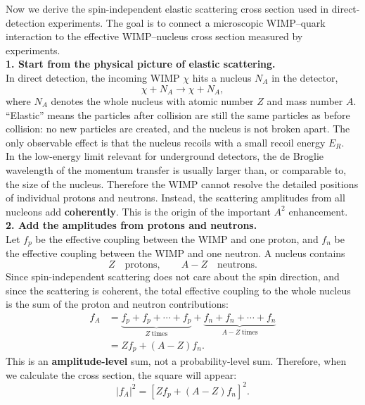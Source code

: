 \clearpage
\begin{foundation}
    Now we derive the spin-independent elastic scattering cross section used in direct-detection experiments. The goal is to connect a microscopic WIMP--quark interaction to the effective WIMP--nucleus cross section measured by experiments. \\

    \textbf{1. Start from the physical picture of elastic scattering.}\\
    In direct detection, the incoming WIMP $\chi$ hits a nucleus $N_A$ in the detector,
    \[
        \chi + N_A \rightarrow \chi + N_A,
    \]
    where $N_A$ denotes the whole nucleus with atomic number $Z$ and mass number $A$. ``Elastic'' means the particles after collision are still the same particles as before collision: no new particles are created, and the nucleus is not broken apart. The only observable effect is that the nucleus recoils with a small recoil energy $E_R$. \\

    In the low-energy limit relevant for underground detectors, the de Broglie wavelength of the momentum transfer is usually larger than, or comparable to, the size of the nucleus. Therefore the WIMP cannot resolve the detailed positions of individual protons and neutrons. Instead, the scattering amplitudes from all nucleons add \textbf{coherently}. This is the origin of the important $A^2$ enhancement. \\

    \textbf{2. Add the amplitudes from protons and neutrons.}\\
    Let $f_p$ be the effective coupling between the WIMP and one proton, and $f_n$ be the effective coupling between the WIMP and one neutron. A nucleus contains
    \[
        Z \quad \text{protons}, \qquad A-Z \quad \text{neutrons}.
    \]
    Since spin-independent scattering does not care about the spin direction, and since the scattering is coherent, the total effective coupling to the whole nucleus is the sum of the proton and neutron contributions:
    \begin{align*}
        f_A &= \underbrace{f_p+f_p+\cdots+f_p}_{Z\ \text{times}}
        +\underbrace{f_n+f_n+\cdots+f_n}_{A-Z\ \text{times}} \\
        &= Z f_p + (A-Z) f_n .
    \end{align*}
    This is an \textbf{amplitude-level} sum, not a probability-level sum. Therefore, when we calculate the cross section, the square will appear:
    \[
        |f_A|^2 = \left[ Z f_p + (A-Z) f_n \right]^2 .
    \]


\end{foundation}
